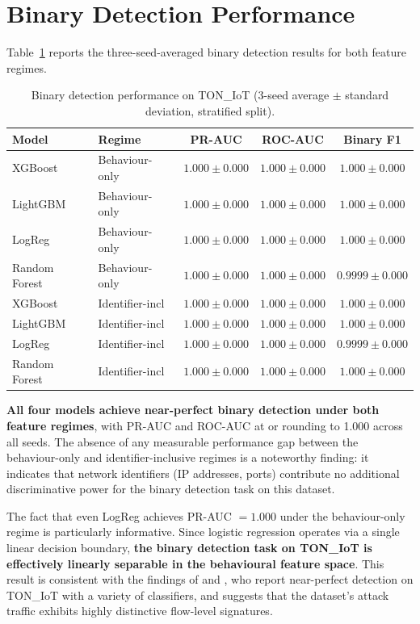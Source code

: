 \documentclass[12pt,a4paper]{report}
\begin{document}
\section{Binary Detection Performance}
\label{sec:binary-results}

Table~\ref{tab:binary} reports the three-seed-averaged binary detection results for both feature regimes.

\begin{table}[H]
\centering
\caption{Binary detection performance on TON\_IoT (3-seed average $\pm$ standard deviation, stratified split).}
\label{tab:binary}
\begin{tabular}{llccc}
\toprule
\textbf{Model} & \textbf{Regime} & \textbf{PR-AUC} & \textbf{ROC-AUC} & \textbf{Binary F1} \\
\midrule
XGBoost & Behaviour-only & $1.000 \pm 0.000$ & $1.000 \pm 0.000$ & $1.000 \pm 0.000$ \\
LightGBM & Behaviour-only & $1.000 \pm 0.000$ & $1.000 \pm 0.000$ & $1.000 \pm 0.000$ \\
LogReg & Behaviour-only & $1.000 \pm 0.000$ & $1.000 \pm 0.000$ & $1.000 \pm 0.000$ \\
Random Forest & Behaviour-only & $1.000 \pm 0.000$ & $1.000 \pm 0.000$ & $0.9999 \pm 0.000$ \\
\midrule
XGBoost & Identifier-incl & $1.000 \pm 0.000$ & $1.000 \pm 0.000$ & $1.000 \pm 0.000$ \\
LightGBM & Identifier-incl & $1.000 \pm 0.000$ & $1.000 \pm 0.000$ & $1.000 \pm 0.000$ \\
LogReg & Identifier-incl & $1.000 \pm 0.000$ & $1.000 \pm 0.000$ & $0.9999 \pm 0.000$ \\
Random Forest & Identifier-incl & $1.000 \pm 0.000$ & $1.000 \pm 0.000$ & $1.000 \pm 0.000$ \\
\bottomrule
\end{tabular}
\end{table}

\textbf{All four models achieve near-perfect binary detection under both feature regimes}, with PR-AUC and ROC-AUC at or rounding to 1.000 across all seeds. The absence of any measurable performance gap between the behaviour-only and identifier-inclusive regimes is a noteworthy finding: it indicates that network identifiers (IP addresses, ports) contribute no additional discriminative power for the binary detection task on this dataset.

The fact that even LogReg achieves PR-AUC $= 1.000$ under the behaviour-only regime is particularly informative. Since logistic regression operates via a single linear decision boundary, \textbf{the binary detection task on TON\_IoT is effectively linearly separable in the behavioural feature space}. This result is consistent with the findings of \citet{alsaedi2020} and \citet{moustafa2021}, who report near-perfect detection on TON\_IoT with a variety of classifiers, and suggests that the dataset's attack traffic exhibits highly distinctive flow-level signatures.
\end{document}
